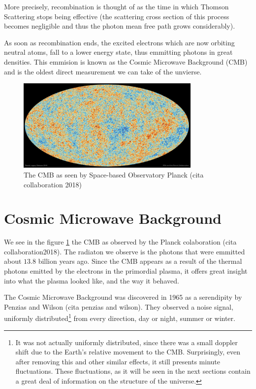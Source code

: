 More precisely, recombination is thought of as the time in which Thomson Scattering stops being effective (the scattering cross section of this process becomes negligible and thus the photon mean free path grows considerably).

As soon as recombination ends, the excited electrons which are now orbiting neutral atoms, fall to a lower energy state, thus emmitting photons in great densities. This emmision is known as the Cosmic Microwave Background (CMB) and is the oldest direct measurement we can take of the unvierse.


\begin{figure}[h]
	\centering
	\includegraphics[width=0.8\textwidth]{../figs/cmb.jpeg}
\caption{The CMB as seen by Space-based Observatory Planck (cita collaboration 2018)}
	\label{fig:cmb}
\end{figure}
\section{Cosmic Microwave Background}

We see in the figure \ref{fig:cmb} the CMB as observed by the Planck colaboration (cita collaboration2018). The radiaton we observe is the photons that were emmitted about $13.8$ billion years ago. Since the CMB appears as a result of the thermal photons emitted by the electrons in the primordial plasma, it offers great insight into what the plasma looked like, and the way it behaved. 

The Cosmic Microwave Background was discovered in 1965 as a serendipity by Penzias and Wilson (cita penzias and wilson). They observed a noise signal, uniformly distributed\footnote{It was not actually uniformly distributed, since there was a small doppler shift due to the Earth's relative movement to the CMB. Surprisingly, even after removing this and other similar effects, it still presents minute fluctuations. These fluctuations, as it will be seen in the next sections contain a great deal of information on the structure of the universe.} from every direction, day or night, summer or winter. 	

